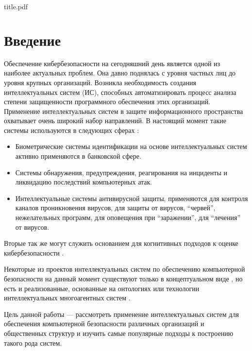 

\def\oldbibitem{}
\let\oldbibitem=\bibitem
\def\bibitem{\stepcounter{citenum}\oldbibitem}



{title.pdf}

\tableofcontents
\newpage

\section{Введение}
Обеспечение кибербезопасности на сегодняшний день является одной из наиболее актуальных проблем.
Она давно поднялась с уровня частных лиц до уровня крупных организаций. Возникла необходимость
создания интеллектуальных систем (ИС), способных автоматизировать процесс анализа степени защищенности
программного обеспечения этих организаций. Применение интеллектуальных систем в защите
информационного пространства охватывает очень широкий набор направлений.
В настоящий момент такие системы используются в следующих сферах \cite{spheres}:

\begin{itemize}
\item
Биометрические системы идентификации на основе интеллектуальных
систем активно применяются в банковской сфере.
\item
Системы обнаружения,
предупреждения, реагирования на инциденты и ликвидацию последствий компьютерных атак.
\item
Интеллектуальные системы антивирусной защиты, применяются для контроля каналов проникновения вирусов,
для защиты от вирусов, ``червей'', нежелательных программ, для оповещения при ``заражении'', для ``лечения''
от вирусов.
\end{itemize}

Вторые так же могут служить основанием для когнитивных подходов к оценке кибербезопасности \cite{kognmodels}.

Некоторые из проектов интеллектуальных систем по обеспечению компьютерной безопасности
на данный момент существуют только в концептуальном виде \cite{concept}, но есть и реализованные,
основанные на онтологиях или технологии интеллектуальных многоагентных систем \cite{multigent}.

Цель данной работы --- рассмотреть применение интеллектуальных систем для обеспечения компьютерной
безопасности различных организаций и общественных структур и изучить самые популярные подходы
к построению такого рода систем.

